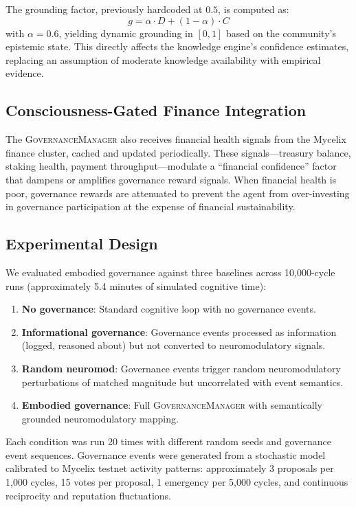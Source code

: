 \documentclass[11pt,a4paper]{article}
\begin{document}
The grounding factor, previously hardcoded at $0.5$, is computed as:
\[
g = \alpha \cdot D + (1 - \alpha) \cdot C
\]
with $\alpha = 0.6$, yielding dynamic grounding in $[0, 1]$ based on the community's epistemic state.
This directly affects the knowledge engine's confidence estimates, replacing an assumption of moderate knowledge availability with empirical evidence.

\subsection{Consciousness-Gated Finance Integration}

The \textsc{GovernanceManager} also receives financial health signals from the Mycelix finance cluster, cached and updated periodically.
These signals---treasury balance, staking health, payment throughput---modulate a ``financial confidence'' factor that dampens or amplifies governance reward signals.
When financial health is poor, governance rewards are attenuated to prevent the agent from over-investing in governance participation at the expense of financial sustainability.

\subsection{Experimental Design}

We evaluated embodied governance against three baselines across 10,000-cycle runs (approximately 5.4 minutes of simulated cognitive time):

\begin{enumerate}
  \item \textbf{No governance}: Standard cognitive loop with no governance events.
  \item \textbf{Informational governance}: Governance events processed as information (logged, reasoned about) but not converted to neuromodulatory signals.
  \item \textbf{Random neuromod}: Governance events trigger random neuromodulatory perturbations of matched magnitude but uncorrelated with event semantics.
  \item \textbf{Embodied governance}: Full \textsc{GovernanceManager} with semantically grounded neuromodulatory mapping.
\end{enumerate}

Each condition was run 20 times with different random seeds and governance event sequences.
Governance events were generated from a stochastic model calibrated to Mycelix testnet activity patterns: approximately 3 proposals per 1,000 cycles, 15 votes per proposal, 1 emergency per 5,000 cycles, and continuous reciprocity and reputation fluctuations.
\end{document}
